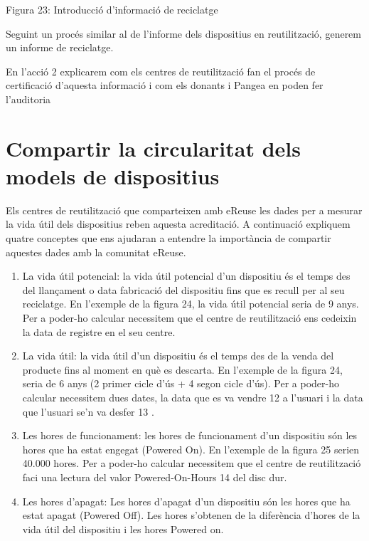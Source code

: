 \documentclass[
]{book}
\begin{document}
Figura 23: Introducció d'informació de reciclatge

Seguint un procés similar al de l'informe dels dispositius en reutilització, generem un informe de reciclatge.

En l'acció 2 explicarem com els centres de reutilització fan el procés de certificació d'aquesta informació i com els donants i Pangea en poden fer l'auditoria

\hypertarget{compartir-la-circularitat-dels-models-de-dispositius}{%
\section{Compartir la circularitat dels models de dispositius}\label{compartir-la-circularitat-dels-models-de-dispositius}}

Els centres de reutilització que comparteixen amb eReuse les dades per a mesurar la vida útil dels dispositius reben aquesta acreditació. A continuació expliquem quatre conceptes que ens ajudaran a entendre la importància de compartir aquestes dades amb la comunitat eReuse.

\begin{enumerate}
\def\labelenumi{\arabic{enumi}.}
\item
  La vida útil potencial: la vida útil potencial d'un dispositiu és el temps des del llançament o data fabricació del dispositiu fins que es recull per al seu reciclatge. En l'exemple de la figura 24, la vida útil potencial seria de 9 anys. Per a poder-ho calcular necessitem que el centre de reutilització ens cedeixin la data de registre en el seu centre.
\item
  La vida útil: la vida útil d'un dispositiu és el temps des de la venda del producte fins al moment en què es descarta. En l'exemple de la figura 24, seria de 6 anys (2 primer cicle d'ús + 4 segon cicle d'ús). Per a poder-ho calcular necessitem dues dates, la data que es va vendre 12 a l'usuari i la data que l'usuari se'n va desfer 13 .
\item
  Les hores de funcionament: les hores de funcionament d'un dispositiu són les hores que ha estat engegat (Powered On). En l'exemple de la figura 25 serien 40.000 hores. Per a poder-ho calcular necessitem que el centre de reutilització faci una lectura del valor Powered-On-Hours 14 del disc dur.
\item
  Les hores d'apagat: Les hores d'apagat d'un dispositiu són les hores que ha estat apagat (Powered Off). Les hores s'obtenen de la diferència d'hores de la vida útil del dispositiu i les hores Powered on.
\end{enumerate}
\end{document}
